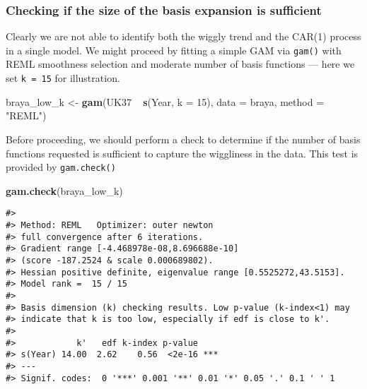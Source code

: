 \documentclass[12pt,]{article}
\newenvironment{Shaded}{\begin{snugshade}}{\end{snugshade}}
\newcommand{\KeywordTok}[1]{\textcolor[rgb]{0.13,0.29,0.53}{\textbf{{#1}}}}
\newcommand{\DataTypeTok}[1]{\textcolor[rgb]{0.13,0.29,0.53}{{#1}}}
\newcommand{\DecValTok}[1]{\textcolor[rgb]{0.00,0.00,0.81}{{#1}}}
\newcommand{\StringTok}[1]{\textcolor[rgb]{0.31,0.60,0.02}{{#1}}}
\newcommand{\NormalTok}[1]{{#1}}
\begin{document}
\subsubsection{Checking if the size of the basis expansion is
sufficient}\label{checking-if-the-size-of-the-basis-expansion-is-sufficient}

Clearly we are not able to identify both the wiggly trend and the CAR(1)
process in a single model. We might proceed by fitting a simple GAM via
\texttt{gam()} with REML smoothness selection and moderate number of
basis functions --- here we set \texttt{k\ =\ 15} for illustration.

\begin{Shaded}
\begin{Highlighting}[]
\NormalTok{braya_low_k <-}\StringTok{ }\KeywordTok{gam}\NormalTok{(UK37 ~}\StringTok{ }\KeywordTok{s}\NormalTok{(Year, }\DataTypeTok{k =} \DecValTok{15}\NormalTok{), }\DataTypeTok{data =} \NormalTok{braya, }\DataTypeTok{method =} \StringTok{"REML"}\NormalTok{)}
\end{Highlighting}
\end{Shaded}

Before proceeding, we should perform a check to determine if the number
of basis functions requested is sufficient to capture the wiggliness in
the data. This test is provided by \texttt{gam.check()}

\begin{Shaded}
\begin{Highlighting}[]
\KeywordTok{gam.check}\NormalTok{(braya_low_k)}
\end{Highlighting}
\end{Shaded}

\begin{verbatim}
#> 
#> Method: REML   Optimizer: outer newton
#> full convergence after 6 iterations.
#> Gradient range [-4.468978e-08,8.696688e-10]
#> (score -187.2524 & scale 0.000689802).
#> Hessian positive definite, eigenvalue range [0.5525272,43.5153].
#> Model rank =  15 / 15 
#> 
#> Basis dimension (k) checking results. Low p-value (k-index<1) may
#> indicate that k is too low, especially if edf is close to k'.
#> 
#>            k'   edf k-index p-value    
#> s(Year) 14.00  2.62    0.56  <2e-16 ***
#> ---
#> Signif. codes:  0 '***' 0.001 '**' 0.01 '*' 0.05 '.' 0.1 ' ' 1
\end{verbatim}
\end{document}
